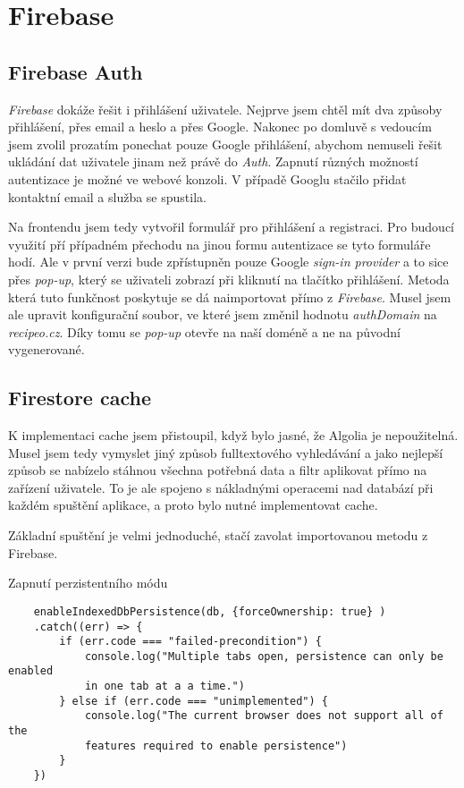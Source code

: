 \section{Firebase}

\subsection{Firebase Auth}
\emph{Firebase} dokáže řešit i přihlášení uživatele. Nejprve jsem chtěl mít dva způsoby přihlášení, přes email a heslo a přes
Google. Nakonec po domluvě s vedoucím jsem zvolil prozatím ponechat pouze Google přihlášení, abychom nemuseli řešit ukládání
dat uživatele jinam než právě do \emph{Auth}. Zapnutí různých možností autentizace je možné ve webové konzoli. V případě Googlu
stačilo přidat kontaktní email a služba se spustila.

Na frontendu jsem tedy vytvořil formulář pro přihlášení a registraci. Pro budoucí využití pří případném přechodu na jinou formu
autentizace se tyto formuláře hodí. Ale v první verzi bude zpřístupněn pouze Google \emph{sign-in provider} a to sice přes \emph{pop-up},
který se uživateli zobrazí při kliknutí na tlačítko přihlášení. Metoda která tuto funkčnost poskytuje se dá naimportovat přímo
z \emph{Firebase}. Musel jsem ale upravit konfigurační soubor, ve které jsem změnil hodnotu \emph{authDomain} na \emph{recipeo.cz}.
Díky tomu se \emph{pop-up} otevře na naší doméně a ne na původní vygenerované.

\subsection{Firestore cache}
K implementaci cache jsem přistoupil, když bylo jasné, že Algolia je nepoužitelná. Musel jsem tedy vymyslet jiný způsob fulltextového
vyhledávání a jako nejlepší způsob se nabízelo stáhnou všechna potřebná data a filtr aplikovat přímo na zařízení uživatele. To je ale
spojeno s nákladnými operacemi nad databází při každém spuštění aplikace, a proto bylo nutné implementovat cache.

Základní spuštění je velmi jednoduché, stačí zavolat importovanou metodu z Firebase.

\begin{listing}[h]
    \caption{Zapnutí perzistentního módu}
    \begin{verbatim}
    enableIndexedDbPersistence(db, {forceOwnership: true} )
    .catch((err) => {
        if (err.code === "failed-precondition") {
            console.log("Multiple tabs open, persistence can only be enabled
            in one tab at a a time.")
        } else if (err.code === "unimplemented") {
            console.log("The current browser does not support all of the
            features required to enable persistence")
        }
    })
    \end{verbatim}
\end{listing}

